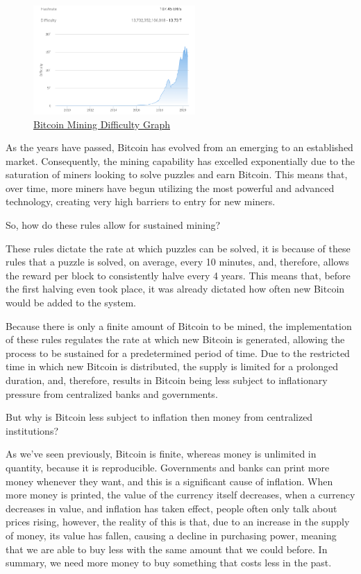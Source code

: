 \documentclass{article}
\begin{document}
\begin{figure}[H]
    \begin{center}
        \includegraphics[width=0.55\textwidth]{images/mining_difficulty.png}
        \caption{\href{https://cointelegraph.com.br/news/bitcoin-mining-difficulty-hasnt-done-this-since-2018-3k-btc-bottom}{\underline{Bitcoin Mining Difficulty Graph}}}
    \end{center}
\end{figure}

As the years have passed, Bitcoin has evolved from an emerging to an established market. Consequently, the mining capability has excelled exponentially due to the saturation of miners looking to solve puzzles and earn Bitcoin. This means that, over time, more miners have begun utilizing the most powerful and advanced technology, creating very high barriers to entry for new miners.

So, how do these rules allow for sustained mining? 

These rules dictate the rate at which puzzles can be solved, it is because of these rules that a puzzle is solved, on average, every 10 minutes, and, therefore, allows the reward per block to consistently halve every 4 years. This means that, before the first halving even took place, it was already dictated how often new Bitcoin would be added to the system.

Because there is only a finite amount of Bitcoin to be mined, the implementation of these rules regulates the rate at which new Bitcoin is generated, allowing the process to be sustained for a predetermined period of time. Due to the restricted time in which new Bitcoin is distributed, the supply is limited for a prolonged duration, and, therefore, results in Bitcoin being less subject to inflationary pressure from centralized banks and governments. 

But why is Bitcoin less subject to inflation then money from centralized institutions?

As we've seen previously, Bitcoin is finite, whereas money is unlimited in quantity, because it is reproducible. Governments and banks can print more money whenever they want, and this is a significant cause of inflation. When more money is printed, the value of the currency itself decreases, when a currency decreases in value, and inflation has taken effect, people often only talk about prices rising, however, the reality of this is that, due to an increase in the supply of money, its value has fallen, causing a decline in purchasing power, meaning that we are able to buy less with the same amount that we could before.
In summary, we need more money to buy something that costs less in the past.
\end{document}

